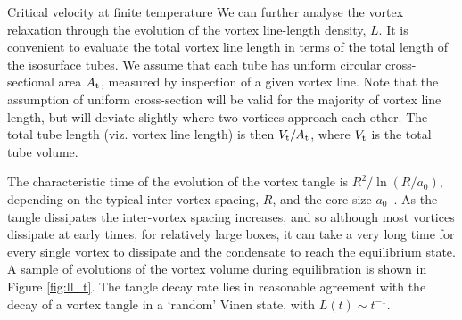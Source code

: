 \begin{chapter}{\label{cha:nonequib}Critical velocity at finite temperature}
We can further analyse the vortex relaxation through the evolution of the vortex line-length density, $L$.  It is convenient to evaluate the total vortex line length in terms of the total length of the isosurface tubes.  We assume that each tube has uniform circular cross-sectional area $A_{\rm t}$, measured by inspection of a given vortex line.  Note that the assumption of uniform cross-section will be valid for the majority of vortex line length, but will deviate slightly where two vortices approach each other.  The total tube length (viz. vortex line length) is then $V_{\rm t}/A_{\rm t}$, where $V_{\rm t}$ is the total tube volume.  

The characteristic time of the evolution of the vortex tangle is $R^2/\ln{(R/a_0)}$, depending on the typical inter-vortex spacing, $R$, and the core size $a_0$~\cite{berloff_2002}. As the tangle dissipates the inter-vortex spacing increases, and so although most vortices dissipate at early times, for relatively large boxes, it can take a very long time for every single vortex to dissipate and the condensate to reach the equilibrium state. A sample of evolutions of the vortex volume during equilibration is shown in Figure \ref{fig:ll_t}. The tangle decay rate lies in reasonable agreement with the decay of a vortex tangle in a `random' Vinen state, with $L(t)\sim t^{-1}$.





\end{chapter}
